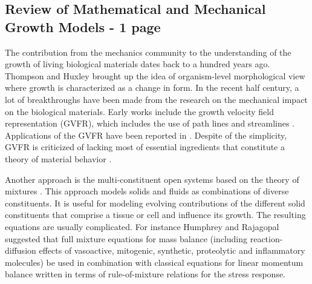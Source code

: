\documentclass[12pt]{article}
\begin{document}
\subsection{Review of Mathematical and Mechanical Growth Models - 1 page}
The contribution from the mechanics community to the understanding of the growth of living biological materials dates back to a hundred years ago. Thompson \cite{Thompson} and Huxley \cite{Huxley} brought up the idea of organism-level morphological view where growth is characterized as a change in form. In the recent half century, a lot of breakthroughs have been made from the research on the mechanical impact on the biological materials. Early works include the growth velocity field representation (GVFR), which includes the use of path lines and streamlines \cite{Truesdell}. Applications of the GVFR have been reported in \cite{Erickson, Erickson2, Richards}. Despite of the simplicity, GVFR is criticized of lacking most of essential ingredients that constitute a theory of material behavior \cite{Cowin}.

Another approach is the multi-constituent open systems based on the theory of mixtures \cite{Bowen, Rajagopal}. This approach models solids and fluids as combinations of diverse constituents. It is useful for modeling evolving contributions of the different solid constituents that comprise a tissue or cell and influence its growth. The resulting equations are usually complicated. For instance Humphrey and Rajagopal \cite{Humphrey} suggested that full mixture equations for mass balance (including reaction-diffusion effects of vasoactive, mitogenic, synthetic, proteolytic and inflammatory molecules) be used in combination with classical equations for linear momentum balance written in terms of rule-of-mixture relations for the stress response.
\end{document}
